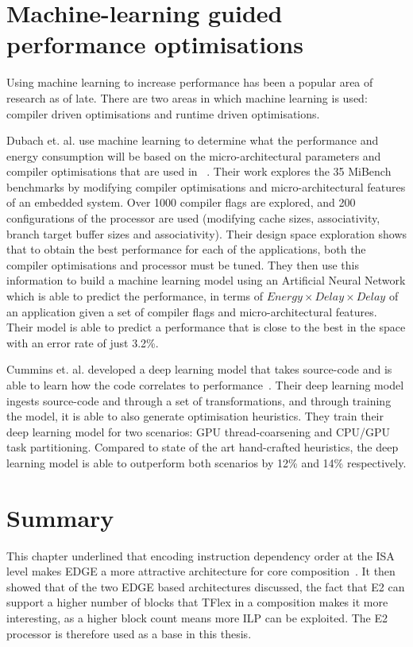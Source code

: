 \section{Machine-learning guided performance optimisations}

Using machine learning to increase performance has been a popular area of research as of late.
There are two areas in which machine learning is used: compiler driven optimisations and runtime driven optimisations.

Dubach et. al. use machine learning to determine what the performance and energy consumption will be based on the micro-architectural parameters and compiler optimisations that are used in ~\cite{DubachExpl2012}.
Their work explores the 35 MiBench benchmarks by modifying compiler optimisations and micro-architectural features of an embedded system.
Over 1000 compiler flags are explored, and 200 configurations of the processor are used (modifying cache sizes, associativity, branch target buffer sizes and associativity).
Their design space exploration shows that to obtain the best performance for each of the applications, both the compiler optimisations and processor must be tuned.
They then use this information to build a machine learning model using an Artificial Neural Network which is able to predict the performance, in terms of $Energy \times Delay \times Delay$ of an application given a set of compiler flags and micro-architectural features.
Their model is able to predict a performance that is close to the best in the space with an error rate of just 3.2\%.

Cummins et. al. developed a deep learning model that takes source-code and is able to learn how the code correlates to performance~\cite{cummins2017pact}.
Their deep learning model ingests source-code and through a set of transformations, and through training the model, it is able to also generate optimisation heuristics.
They train their deep learning model for two scenarios: GPU thread-coarsening and CPU/GPU task partitioning.
Compared to state of the art hand-crafted heuristics, the deep learning model is able to outperform both scenarios by 12\% and 14\% respectively.
\vspace{-1.5em}
\section{Summary}
This chapter underlined that encoding instruction dependency order at the ISA level makes EDGE a more attractive architecture for core composition~\cite{kim2007tflex}.
It then showed that of the two EDGE based architectures discussed, the fact that E2 can support a higher number of blocks that TFlex in a composition makes it more interesting, as a higher block count means more ILP can be exploited.
The E2 processor is therefore used as a base in this thesis.

